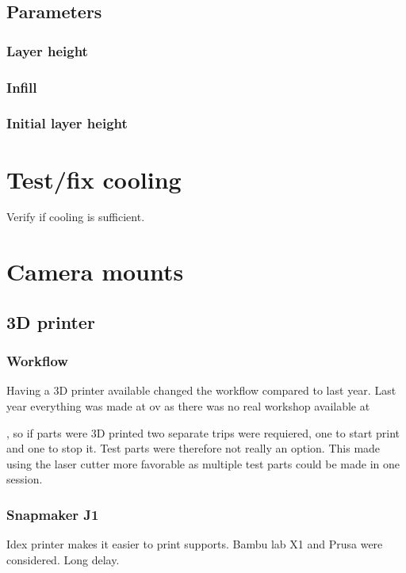 \subsection{Parameters}
\subsubsection{Layer height}
\subsubsection{Infill}
\subsubsection{Initial layer height}




\section{Test/fix cooling}
Verify if cooling is sufficient.

\section{Camera mounts}

\subsection{3D printer}

\subsubsection{Workflow}
Having a 3D printer available changed the workflow compared to last year.
Last year everything was made at \gls{ov} as there was no real workshop available at

, so if parts were 3D printed two separate trips were requiered, one to start print and one to stop it.
Test parts were therefore not really an option.
This made using the laser cutter more favorable as multiple test parts could be made in one session.

\subsubsection{Snapmaker J1}
Idex printer makes it easier to print supports.
Bambu lab X1 and Prusa were considered.
Long delay.

